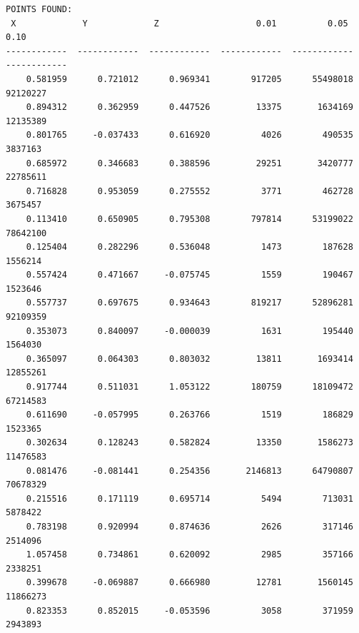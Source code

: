 \begin{minipage}{\linewidth}
\begin{verbatim}
POINTS FOUND:
 X             Y             Z                   0.01          0.05          0.10
------------  ------------  ------------  ------------  ------------  ------------
    0.581959      0.721012      0.969341        917205      55498018      92120227
    0.894312      0.362959      0.447526         13375       1634169      12135389
    0.801765     -0.037433      0.616920          4026        490535       3837163
    0.685972      0.346683      0.388596         29251       3420777      22785611
    0.716828      0.953059      0.275552          3771        462728       3675457
    0.113410      0.650905      0.795308        797814      53199022      78642100
    0.125404      0.282296      0.536048          1473        187628       1556214
    0.557424      0.471667     -0.075745          1559        190467       1523646
    0.557737      0.697675      0.934643        819217      52896281      92109359
    0.353073      0.840097     -0.000039          1631        195440       1564030
    0.365097      0.064303      0.803032         13811       1693414      12855261
    0.917744      0.511031      1.053122        180759      18109472      67214583
    0.611690     -0.057995      0.263766          1519        186829       1523365
    0.302634      0.128243      0.582824         13350       1586273      11476583
    0.081476     -0.081441      0.254356       2146813      64790807      70678329
    0.215516      0.171119      0.695714          5494        713031       5878422
    0.783198      0.920994      0.874636          2626        317146       2514096
    1.057458      0.734861      0.620092          2985        357166       2338251
    0.399678     -0.069887      0.666980         12781       1560145      11866273
    0.823353      0.852015     -0.053596          3058        371959       2943893
\end{verbatim}
\end{minipage} \\

